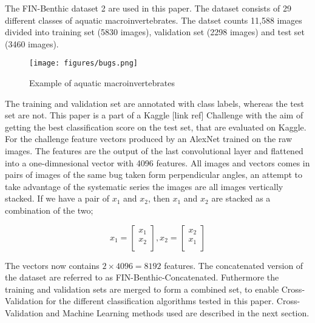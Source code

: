 The FIN-Benthic \cite{finbenthic} dataset 2 are used in this paper. The dataset consists of 29 different classes of aquatic macroinvertebrates. The datset counts 11,588 images divided into training set (5830 images), validation set (2298 images) and test set (3460 images). 

\begin{figure}[H]
    \centering
    \texttt{[image: figures/bugs.png]}
    \caption{Example of aquatic macroinvertebrates}
\end{figure}

The training and validation set are annotated with class labels, whereas the test set are not. This paper is a part of a Kaggle [link ref] Challenge with the aim of getting the best classification score on the test set, that are evaluated on Kaggle. For the challenge feature vectors produced by an AlexNet\cite{Krizhevsky:2012} trained on the raw images. The features are the output of the last convolutional layer and flattened into a one-dimnesional vector with 4096 features. All images and vectors comes in pairs of images of the same bug taken form perpendicular angles, an attempt to take advantage of the systematic series the images are all images vertically stacked. If we have a pair of $x_1$ and $x_2$, then $x_1$ and $x_2$ are stacked as a combination of the two; 

$$x_1=\begin{bmatrix} x_{1} \\ x_{2} \\ \end{bmatrix}, x_2 = \begin{bmatrix} x_{2} \\ x_{1} \\ \end{bmatrix}$$

The vectors now contains $2 \times 4096 = 8192$ features. The concatenated version of the dataset are referred to as FIN-Benthic-Concatenated. Futhermore the training and validation sets are merged to form a combined set, to enable Cross-Validation for the different classification algorithms tested in this paper. Cross-Validation and Machine Learning methods used are described in the next section.